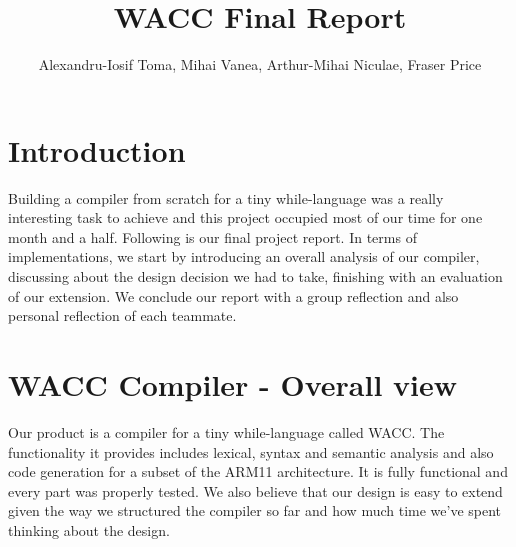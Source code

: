 \documentclass[11pt]{article}
\begin{document}
\title{WACC Final Report}
\author{
	Alexandru-Iosif Toma,
    Mihai Vanea,
	Arthur-Mihai Niculae,
    Fraser Price
}
\maketitle

\section{Introduction}
Building a compiler from scratch for a tiny while-language was a really interesting
task to achieve and this project occupied most of our time for one month and a half.
Following is our final project report. In terms of implementations, we start
by introducing an overall analysis of our compiler, discussing about the design
decision we had to take, finishing with an evaluation of our extension.
We conclude our report with a group reflection and also personal reflection of each teammate.

\section{WACC Compiler - Overall view}
\iffalse
THE PRODUCT(1/4)
1. An analysis and critical evaluation of the quality of the WACC compiler
2. It meets the functional specification?
3. Judge that it forms a sound basis for future development
4. May wish to address performance issues.
\fi
Our product is a compiler for a tiny while-language called WACC. The functionality
it provides includes lexical, syntax and semantic analysis and also code generation
for a subset of the ARM11 architecture. It is fully functional and every part
was properly tested. We also believe that our design is easy to extend given the way
we structured the compiler so far and how much time we've spent thinking about the design.
\end{document}
